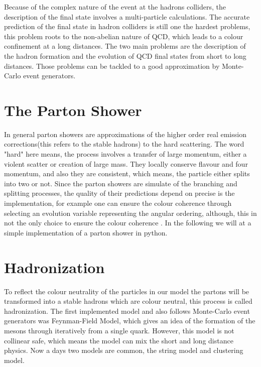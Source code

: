 Because of the complex nature of the event at the hadrons colliders, the description of the final state involves a multi-particle calculations. The accurate prediction of the final state in hadron colliders is still one the hardest problems, this problem roots to the non-abelian nature of QCD, which leads to a colour confinement at a long distances. The two main problems are the description of the hadron formation and the evolution of QCD final states from short to long distances. Those problems can be tackled to a good approximation by Monte-Carlo event generators.


\section{The Parton Shower}
In general parton showers are approximations of the higher order real emission corrections(this refers to the stable hadrons) to the hard scattering. The word "hard" here means,
the process involves a transfer of large momentum, either a violent scatter or creation of large mass. They locally conserve flavour and four momentum, and also they are consistent, which means, the particle either splits into two or not. 
Since the parton showers are simulate of the branching and splitting processes, the quality of their predictions depend on precise is the implementation, for example one can ensure the colour coherence through selecting an evolution variable representing the angular ordering, although, this in not the only choice to ensure the colour coherence \citep{introduction}.
In the following we will at a simple implementation of a parton shower in python.

\section{Hadronization}  

To reflect the colour neutrality of the particles in our model the partons will be transformed into a stable hadrons which are colour neutral, this process is called hadronization. The first implemented model and also follows Monte-Carlo event generators was Feynman-Field Model, which gives an idea of the formation of the mesons through iteratively from a single quark. However, this model is not collinear safe,
which means the model can mix the short and long distance physics. Now a days two models are common, the string model and clustering model\citep{introduction}. 
     
